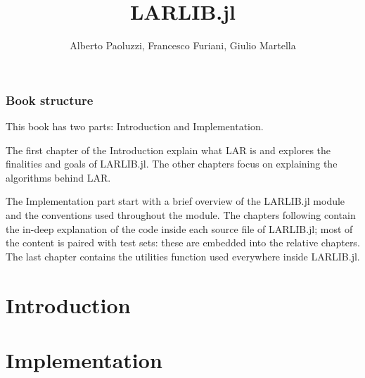 \documentclass[10pt]{book}
\author{Alberto Paoluzzi, Francesco Furiani, Giulio Martella}
\title{LARLIB.jl}
\begin{document}
\frontmatter
\maketitle

\section*{Book structure}

This book has two parts: Introduction and Implementation.

The first chapter of the Introduction explain what LAR is
and explores the finalities and goals of LARLIB.jl. The other 
chapters focus on explaining the algorithms behind LAR.

The Implementation part start with a brief overview of the
LARLIB.jl module and the conventions used throughout the module.
The chapters following contain the in-deep
explanation of the code inside each source file of LARLIB.jl;
most of the content is paired with test sets: these are
embedded into the relative chapters. The last chapter
contains the utilities function used everywhere inside LARLIB.jl.

\tableofcontents

\mainmatter

\part{Introduction}


\part{Implementation}










\backmatter


{}

\end{document}

